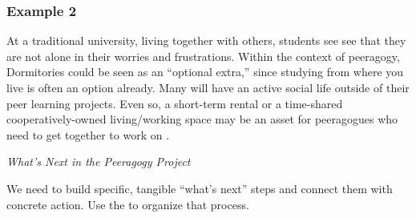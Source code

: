 \subsubsection*{Example 2}
At a traditional university,  living together with others, students see see that they are not alone in their worries and frustrations.  Within the context of peeragogy, Dormitories could be seen as an ``optional extra,'' since studying
from where you live is often an option already.  Many will have an active social life outside of their peer learning projects.  Even so, a short-term rental or a time-shared cooperatively-owned living/working space may be an asset for peeragogues who need to get together to work on .


\begin{framed}
\noindent 
\emph{What's Next in the Peeragogy Project}
\begin{collectinmacro}{\SpecificWN}{}{}
We need to build specific, tangible ``what's next'' steps and connect them with concrete action. Use the  to organize that process. 
\end{collectinmacro}
\SpecificWN
\end{framed}

